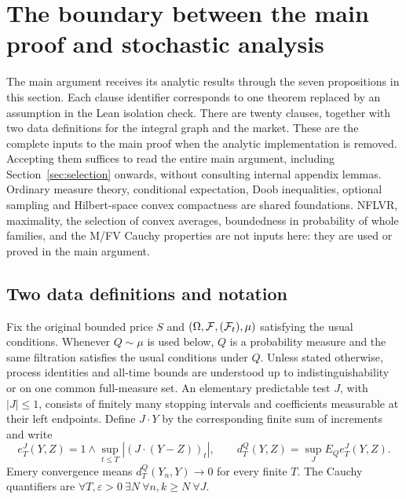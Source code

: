 \section{The boundary between the main proof and stochastic analysis}
\label{sec:graph}
The main argument receives its analytic results through the seven propositions in this section.
Each clause identifier corresponds to one theorem replaced by an assumption in the Lean isolation check.
There are twenty clauses, together with two data definitions for the integral graph and the market.
These are the complete inputs to the main proof when the analytic implementation is removed.
Accepting them suffices to read the entire main argument, including Section~\ref{sec:selection} onwards,
without consulting internal appendix lemmas.
Ordinary measure theory, conditional expectation, Doob inequalities, optional sampling and Hilbert-space convex compactness are shared foundations.
NFLVR, maximality, the selection of convex averages, boundedness in probability of whole families,
and the M/FV Cauchy properties are not inputs here: they are used or proved in the main argument.

\subsection{Two data definitions and notation}
Fix the original bounded price $S$ and $(\Omega,\mathcal F,(\mathcal F_t),\mu)$ satisfying the usual conditions.
Whenever $Q\sim\mu$ is used below, $Q$ is a probability measure and the same filtration satisfies the usual conditions under $Q$.
Unless stated otherwise, process identities and all-time bounds are understood up to indistinguishability or on one common full-measure set.
An elementary predictable test $J$, with $|J|\leq1$, consists of finitely many stopping intervals and coefficients measurable at their left endpoints.
Define $J\cdot Y$ by the corresponding finite sum of increments and write
\[
 e_T^J(Y,Z)=1\wedge\sup_{t\leq T}|(J\cdot(Y-Z))_t|,
 \qquad d_T^Q(Y,Z)=\sup_J E_Q e_T^J(Y,Z).
\]
Emery convergence means $d_T^Q(Y_n,Y)\to0$ for every finite $T$.
The Cauchy quantifiers are $\forall T,\varepsilon>0\ \exists N\ \forall n,k\geq N\ \forall J$.

